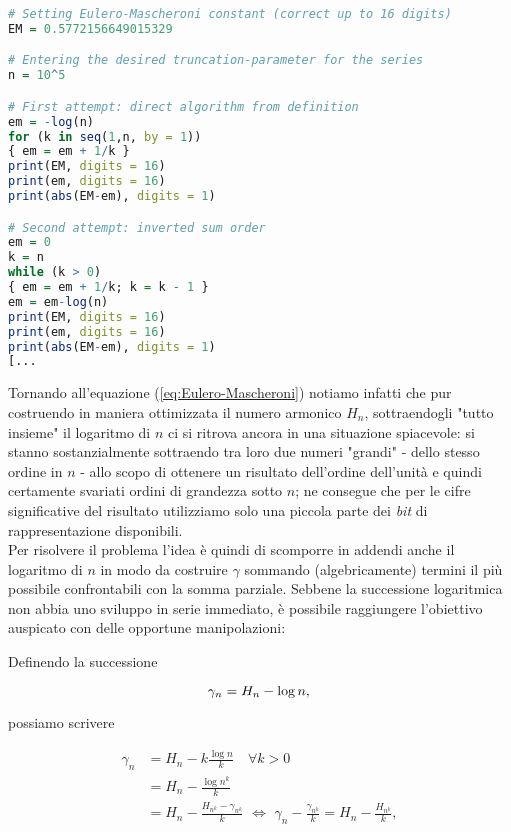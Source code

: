 \begin{lstlisting}[language=R, style=Rstyle, caption= \texttt{R} code for naïve computation of Eulero-Mascheroni constant, xleftmargin=.02\textwidth]
# Setting Eulero-Mascheroni constant (correct up to 16 digits)
EM = 0.5772156649015329

# Entering the desired truncation-parameter for the series
n = 10^5

# First attempt: direct algorithm from definition
em = -log(n)
for (k in seq(1,n, by = 1))
{ em = em + 1/k	} 
print(EM, digits = 16)
print(em, digits = 16)
print(abs(EM-em), digits = 1)

# Second attempt: inverted sum order
em = 0
k = n
while (k > 0)
{ em = em + 1/k; k = k - 1 }
em = em-log(n)
print(EM, digits = 16)
print(em, digits = 16)
print(abs(EM-em), digits = 1)
[...
\end{lstlisting}

\noindent Tornando all'equazione (\ref{eq:Eulero-Mascheroni}) notiamo infatti che pur costruendo in maniera ottimizzata il numero armonico $H_n$, sottraendogli "tutto insieme" il logaritmo di $n$ ci si ritrova ancora in una situazione spiacevole: si stanno sostanzialmente sottraendo tra loro due numeri "grandi" - dello stesso ordine in $n$ - allo scopo di ottenere un risultato dell'ordine dell'unità e quindi certamente svariati ordini di grandezza sotto $n$; ne consegue che per le cifre significative del risultato utilizziamo solo una piccola parte dei \emph{bit} di rappresentazione disponibili.\\

\noindent Per risolvere il problema l'idea è quindi di scomporre in addendi anche il logaritmo di $n$ in modo da costruire $\gamma$ sommando (algebricamente) termini il più possibile confrontabili con la somma parziale. Sebbene la successione logaritmica non abbia uno sviluppo in serie immediato, è possibile raggiungere l'obiettivo auspicato con delle opportune manipolazioni:\\ \bigskip

Definendo la successione

\begin{equation*}
\gamma_n =  H_n - \log n,\\
\end{equation*}

possiamo scrivere

\begin{align*}
\gamma_n &= H_n - k \frac{\log n}{k}\quad\forall k > 0  \\
&=  H_n - \frac{\log n^k}{k}\\
&= H_n - \frac{H_{n^k} - \gamma_{n^k}}{k}\,\, \Longleftrightarrow\,\,\gamma_n - \frac{\gamma_{n^k}}{k} =  H_n - \frac{H_{n^k}}{k},\\
\end{align*}

